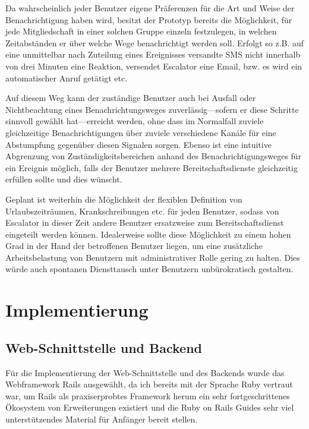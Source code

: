 \documentclass[11pt,utf8,notoc,bibnum,german,final]{zihpub}
\begin{document}
Da wahrscheinlich jeder Benutzer eigene Präferenzen für die Art und Weise der
Benachrichtigung haben wird, besitzt der Prototyp bereits die Möglichkeit, für
jede Mitgliedschaft in einer solchen Gruppe einzeln festzulegen, in welchen
Zeitabständen er über welche Wege benachrichtigt werden soll. Erfolgt so z.B.
auf eine unmittelbar nach Zuteilung eines Ereignisses versandte SMS nicht
innerhalb von drei Minuten eine Reaktion, versendet Escalator eine Email, bzw.
es wird ein automatischer Anruf getätigt etc.

Auf diesem Weg kann der zuständige Benutzer auch bei Ausfall oder
Nichtbeachtung eines Benachrichtungsweges zuverlässig—sofern er diese Schritte
sinnvoll gewählt hat—erreicht werden, ohne dass im Normalfall zuviele
gleichzeitige Benachrichtigungen über zuviele verschiedene Kanäle für eine
Abstumpfung gegenüber diesen Signalen sorgen. Ebenso ist eine intuitive
Abgrenzung von Zuständigkeitsbereichen anhand des Benachrichtigungsweges für
ein Ereignis möglich, falls der Benutzer mehrere Bereitschaftsdienste
gleichzeitig erfüllen sollte und dies wünscht.


Geplant ist weiterhin die Möglichkeit der flexiblen Definition von
Urlaubszeiträumen, Krankschreibungen etc. für jeden Benutzer, sodass von
Escalator in dieser Zeit andere Benutzer ersatzweise zum Bereitschaftsdienst
eingeteilt werden können. Idealerweise sollte diese Möglichkeit zu einem hohen
Grad in der Hand der betroffenen Benutzer liegen, um eine zusätzliche
Arbeitsbelastung von Benutzern mit administrativer Rolle gering zu halten. Dies
würde auch spontanen Diensttausch unter Benutzern unbürokratisch gestalten.

\section{Implementierung}

\subsection{Web-Schnittstelle und Backend}

Für die Implementierung der Web-Schnittstelle und des Backends wurde das
Webframework Rails \cite{rails} ausgewählt, da ich bereits mit der Sprache
Ruby vertraut war, um Rails als praxiserprobtes Framework herum ein sehr
fortgeschrittenes Ökosystem von Erweiterungen existiert und die Ruby on Rails
Guides \cite{rails-guides} sehr viel unterstützendes Material für Anfänger
bereit stellen.
\end{document}
